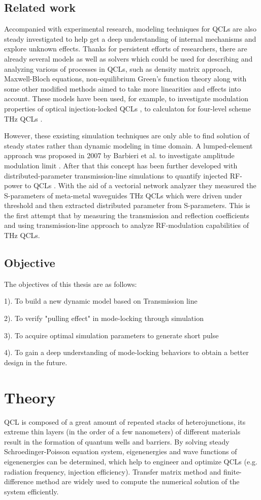 \documentclass[11pt,final]{scrbook}
\begin{document}
\section{Related work}
Accompanied with experimental research, modeling techniques for QCLs are also steady investigated to help get a deep understanding of internal mechanisms and explore unknown effects. Thanks for persistent efforts of researchers, there are already several models as well as solvers which could be used for describing and analyzing various of processes in QCLs, such as density matrix approach, Maxwell-Bloch equations, non-equilibrium Green’s function theory along with some other modified methods aimed to take more linearities and effects into account. These models have been used, for example, to investigate modulation properties of optical injection-locked QCLs \cite{wang2013rate}, to calculaton for four-level scheme THz QCLs \cite{yasuda2009nonequilibrium}.

However, these exsisting simulation techniques are only able to find solution of steady states rather than dynamic modeling in time domain. A lumped-element approach was proposed in 2007 by Barbieri et al. to investigate amplitude modulation limit \cite{barbieri200713}. After that this concept has been further developed with distributed-parameter transmission-line simulations to quantify injected RF-power to QCLs \cite{maineult2010microwave}. With the aid of a vectorial network analyzer they measured the S-parameters of meta-metal waveguides THz QCLs which were driven under threshold and then extracted distributed parameter from S-parameters. This is the first attempt that by measuring the transmission and reflection coefficients and using transmission-line approach to analyze RF-modulation capabilities of THz QCLs.

\section{Objective}
The objectives of this thesis are as follows:

1). To build a new dynamic model based on Transmission line

2). To verify "pulling effect" in mode-locking through simulation

3). To acquire optimal simulation parameters to generate short pulse

4). To gain a deep understanding of mode-locking behaviors to obtain a better design in the future.

\chapter{Theory}
QCL is composed of a great amount of repeated stacks of heterojunctions, its extreme thin layers (in the order of a few nanometers) of different materials result in the formation of quantum wells and barriers. By solving steady Schroedinger-Poisson equation system, eigenenergies and wave functions of eigenenergies can be determined, which help to engineer and optimize QCLs (e.g. radiation frequency, injection efficiency).  Transfer matrix method \cite{jonsson1990solving} and finite-difference method \cite{tan1990self} are widely used to compute the numerical solution of the system efficiently. 
\end{document}
